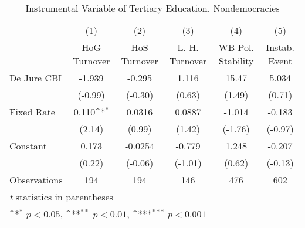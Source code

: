 \begin{table}[htbp]\centering
\def\sym#1{\ifmmode^{#1}\else\(^{#1}\)\fi}
\caption{Instrumental Variable of Tertiary Education, Nondemocracies \label{ndemIfivs}}
\begin{tabular}{l*{5}{c}}
\toprule
                                        &\multicolumn{1}{c}{(1)}&\multicolumn{1}{c}{(2)}&\multicolumn{1}{c}{(3)}&\multicolumn{1}{c}{(4)}&\multicolumn{1}{c}{(5)}\\
                                        &\multicolumn{1}{c}{HoG Turnover}&\multicolumn{1}{c}{HoS Turnover}&\multicolumn{1}{c}{L. H. Turnover}&\multicolumn{1}{c}{WB Pol. Stability}&\multicolumn{1}{c}{Instab. Event}\\
\midrule
De Jure CBI                             &   -1.939         &   -0.295         &    1.116         &    15.47         &    5.034         \\
                                        &  (-0.99)         &  (-0.30)         &   (0.63)         &   (1.49)         &   (0.71)         \\
\addlinespace
Fixed Rate                              &    0.110\sym{*}  &   0.0316         &   0.0887         &   -1.014         &   -0.183         \\
                                        &   (2.14)         &   (0.99)         &   (1.42)         &  (-1.76)         &  (-0.97)         \\
\addlinespace
Constant                                &    0.173         &  -0.0254         &   -0.779         &    1.248         &   -0.207         \\
                                        &   (0.22)         &  (-0.06)         &  (-1.01)         &   (0.62)         &  (-0.13)         \\
\midrule
Observations                            &      194         &      194         &      146         &      476         &      602         \\
\bottomrule
\multicolumn{6}{l}{\footnotesize \textit{t} statistics in parentheses}\\
\multicolumn{6}{l}{\footnotesize \sym{*} \(p<0.05\), \sym{**} \(p<0.01\), \sym{***} \(p<0.001\)}\\
\end{tabular}
\end{table}
